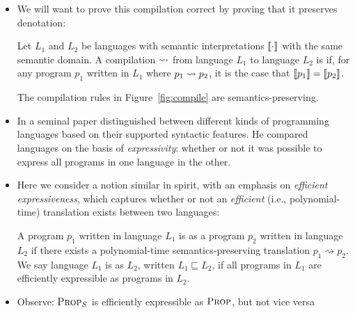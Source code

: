 \documentclass{tufte-handout}
\begin{document}
\begin{itemize}
  \item We will want to prove this compilation correct by proving that it preserves denotation:
  \begin{definition}
    Let $L_1$ and $L_2$ be languages with semantic interpretations $\left \llbracket {\cdot} \right \rrbracket$
    with the same semantic domain.
    A compilation $\rightsquigarrow$ from language $L_1$ to language $L_2$ is
     if, for any program $p_1$ written in $L_1$ 
    where $p_1 \rightsquigarrow p_2$, it is the case that $\left \llbracket {p_1} \right \rrbracket = \left \llbracket {p_2} \right \rrbracket$.
  \end{definition}
  \begin{theorem}
    The compilation rules in Figure~\ref{fig:compile} are semantics-preserving.
  \end{theorem}
  \item In a seminal paper \citet{felleisen1990expressive} distinguished between
  different kinds of programming languages based on their supported syntactic features. He
  compared languages on the basis of \emph{expressivity}: whether or not it was
  possible to express all programs in one language in the other. 
  \item Here we consider a notion similar in spirit,
    with an emphasis on \emph{efficient
     expressiveness}, which captures whether or not an \emph{efficient} (i.e., polynomial-time)
  translation exists between two languages:
  \begin{definition}
    A program $p_1$ written in language $L_1$ is  
    as a program $p_2$ written in language $L_2$ if
    there exists a polynomial-time semantics-preserving translation $p_1
    \rightsquigarrow p_2$. 
    We say language $L_1$ is  as $L_2$, written $L_1 \sqsubseteq L_2$, 
    if all programs in $L_1$ are efficiently expressible as programs in $L_2$.
  \end{definition}

  \item Observe: $\textsc{Prop}_S$ is efficiently expressible as $\textsc{Prop}$, but not vice versa




\end{itemize}
\end{document}
